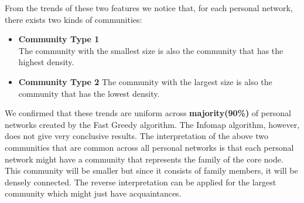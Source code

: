 \documentclass{article}
\begin{document}
From the trends of these two features we notice that, for each personal network, there exists two kinds of communities:\\
\begin{itemize}
 \item \textbf{Community Type 1}\\
The community with the smallest size is also the community that has the highest density.
\item \textbf{Community Type 2}
The community with the largest size is also the community that has the lowest density.
\end{itemize}
We confirmed that
these trends are uniform across \textbf{majority(90\%)} of personal networks created by the Fast Greedy algorithm. The 
Infomap algorithm, however, does not give very conclusive results.
The interpretation of the above two communities that are common across all personal networks is that 
each personal network might have a community that represents the family of the core node. This community will be 
smaller but since it consists of family members, it will be densely connected. The reverse interpretation can be 
applied for the largest community which might just have acquaintances.\\
\end{document}
